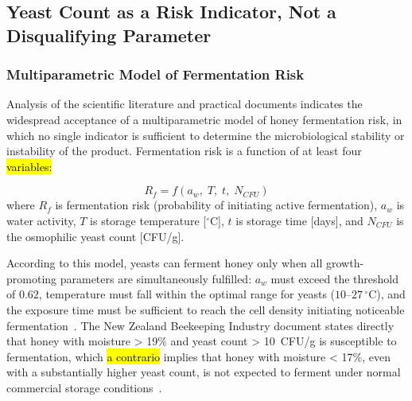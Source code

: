 \documentclass[foods,review,accept,pdftex,moreauthors]{Definitions/mdpi}
\begin{document}
{\subsection{Yeast Count as a Risk Indicator, Not a Disqualifying Parameter}\label{4.3}


\subsubsection{Multiparametric Model of Fermentation Risk}

Analysis of the scientific literature and practical documents
indicates the widespread acceptance of a multiparametric model
of honey fermentation risk, in which no single indicator is
sufficient to determine the microbiological stability or
instability of the product. Fermentation risk is a function
of at least four \hl{variables:} %


\begin{equation}
R_f = f\!\left(a_w,\; T,\; t,\; N_{CFU}\right)
\label{eq:fermentation_risk}
\end{equation}
 where $R_f$ is fermentation risk (probability of initiating
active fermentation), $a_w$ is water activity, $T$ is storage
temperature [$^\circ$C], $t$ is storage time [days],
and $N_{CFU}$ is the osmophilic yeast count [CFU/g].

According to this model, yeasts can ferment honey only when
{all} growth-promoting parameters are simultaneously fulfilled:
$a_w$ must exceed the threshold of $0.62$, temperature must fall
within the optimal range for yeasts ($10$--$27\,^\circ$C),
and the exposure time must be sufficient to reach the cell density
initiating noticeable fermentation~\cite{apinz2021}.
The New Zealand Beekeeping Industry document states directly that
honey with moisture > 19\% and yeast count > 10~CFU/g is
susceptible to fermentation, which \hl{a contrario} implies
that {
honey with moisture < 17\%, even with a substantially higher yeast count, is not expected to ferment under normal commercial storage conditions}~\cite{apinz2021}.

}
\end{document}
